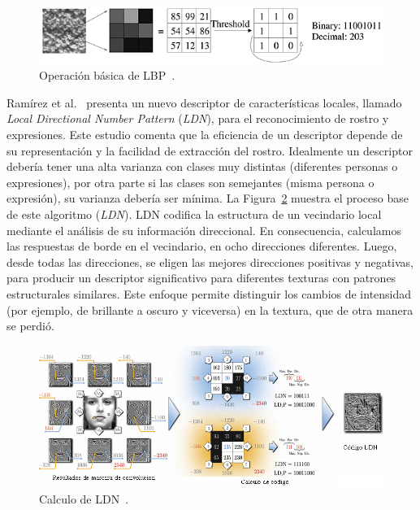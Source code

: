 \begin{figure}[tb]
 \centering
  \includegraphics[width=1\textwidth]{Figuras/lbp.jpg}
  \caption[Operación básica de LBP]{Operación básica de LBP~\cite{ahonen2006}.}
  \label{fig:lbp}
\end{figure}

Ramírez et al.~\cite{ldnp2013} presenta un nuevo descriptor de características locales, llamado \textit{Local Directional Number Pattern} (\textit{LDN}), para el reconocimiento de rostro y expresiones. Este estudio comenta que la eficiencia de un descriptor depende de su representación y la facilidad de extracción del rostro. Idealmente un descriptor debería tener una alta varianza con clases muy distintas (diferentes personas o expresiones), por otra parte si las clases son semejantes (misma persona o expresión), su varianza debería ser mínima. La Figura~\ref{fig:ldn} muestra el proceso base de este algoritmo (\textit{LDN}). LDN codifica la estructura de un vecindario local mediante el análisis de su información direccional. En consecuencia, calculamos las respuestas de borde en el vecindario, en ocho direcciones diferentes. Luego, desde todas las direcciones, se eligen las mejores direcciones positivas y negativas, para producir un descriptor significativo para diferentes texturas con patrones estructurales similares. Este enfoque permite distinguir los cambios de intensidad (por ejemplo, de brillante a oscuro y viceversa) en la textura, que de otra manera se perdió.

\begin{figure}[tb]
 \centering
  \includegraphics[width=1\textwidth]{Figuras/ldn.jpg}
  \caption[Calculo de LDN]{Calculo de LDN~\cite{ldnp2013}.}
  \label{fig:ldn}
\end{figure}

